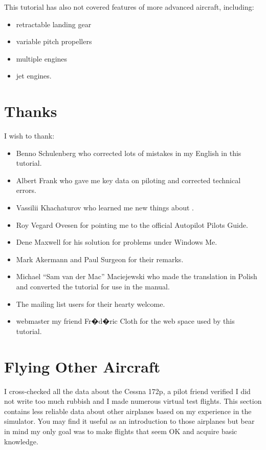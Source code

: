 This tutorial has also not covered features of more advanced aircraft, 
including:
\begin{itemize}
  \item retractable landing gear
  \item variable pitch propellers
  \item multiple engines
  \item jet engines.
\end{itemize}  

\section{Thanks}

I wish to thank:
\begin{itemize}
	\item Benno Schulenberg who corrected lots of mistakes in my English in this 
  tutorial. 
	\item Albert Frank who gave me key data on piloting and corrected technical 
  errors.
	\item Vassilii Khachaturov who learned me new things about \FlightGear. 
	\item Roy Vegard Ovesen for pointing me to the official Autopilot Pilots Guide.
	\item Dene Maxwell for his solution for problems under Windows Me. 
	\item Mark Akermann and Paul Surgeon for their remarks. 
	\item Michael ``Sam van der Mac'' Maciejewski who made the translation in 
  Polish and converted the tutorial for use in the manual.
	\item The \FlightGear{} mailing list users for their hearty welcome. 
  \item {} webmaster my friend Fr�d�ric Cloth for 
  the web space used by this tutorial. 
\end{itemize}

\section{Flying Other Aircraft}

I cross-checked all the data about the Cessna 172p, a pilot friend verified I 
did not write too much rubbish and I made numerous virtual test flights. This 
section contains less reliable data about other airplanes based on my experience
in the simulator. You may find it useful as an introduction to those airplanes 
but bear in mind my only goal was to make flights that seem OK and acquire basic 
knowledge.


